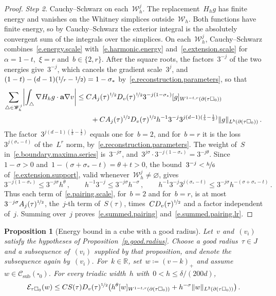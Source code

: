 \documentclass[11pt,letterpaper]{article}
\numberwithin{equation}{section}
\newtheorem{proposition}[theorem]{Proposition}
\theoremstyle{definition}
\newcommand{\R}{\mathbb{R}}
\renewcommand{\a}{\mathbf{a}}
\newcommand{\nf}{\nicefrac}
\newcommand{\cu}{\square}
\DeclarePairedDelimiter{\norm}{\lVert}{\rVert}
\newcommand{\Ener}{\mathcal E}
\newcommand{\Csub}{\mathcal C_{\mathrm{sub}}}
\begin{document}
\begin{proof}
\emph{Step 2.} Cauchy--Schwarz on each~$\mathscr W_h^j$. The replacement~$H_hg$ has finite energy and vanishes on the Whitney simplices outside~$\mathscr W_h$. Both functions have finite energy, so by Cauchy--Schwarz the exterior integral is the absolutely convergent sum of the integrals over the simplices. On each~$\mathscr W_h^j$, Cauchy--Schwarz combines~\eqref{e.energy.scale} with~\eqref{e.harmonic.energy} and~\eqref{e.extension.scale} for~$\alpha=1-t$,~$\xi=r$ and~$b\in\{2,r\}$. After the square roots, the factors~$3^{-j}$ of the two energies give~$3^{-j}$, which cancels the gradient scale~$3^j$, and~$(1-t)-(d-1)(\nf1r-\nf12)=1-\sigma_*$ by~\eqref{e.reconstruction.parameters}, so that
\begin{align}
	\sum_{\triangle\in\mathscr W_h^j}\biggl|\int_\triangle\nabla H_hg\cdot\a\nabla v\biggr|&\leq C A_j(\tau)^{\nf12}D_v(\tau)^{\nf12}3^{-j(1-\sigma_*)}[g]_{W^{1-t,r}(\partial(\tau\cu_0))}\notag \\
	& \qquad +C A_j(\tau)^{\nf12}D_v(\tau)^{\nf12}h^{-1}3^{-j}3^{j(d-1)(\frac1b-\frac12)}\norm{g}_{L^b(\partial(\tau\cu_0))}\,.
	\label{e.pairing.scale}
\end{align}
The factor~$3^{j(d-1)(\frac1b-\frac12)}$ equals one for~$b=2$, and for~$b=r$ it is the loss~$3^{j(\sigma_*-t)}$ of the~$L^r$ norm, by~\eqref{e.reconstruction.parameters}. The weight of~$S$ in~\eqref{e.boundary.maxima.series} is~$3^{-j\sigma}$, and~$3^{j\sigma}\cdot3^{-j(1-\sigma_*)}=3^{-j\theta}$. Since~$1-\sigma>0$ and~$1-(\sigma+\sigma_*-t)=\theta+t>0$, the bound~$3^{-j}<\nf h6$ of~\eqref{e.extension.support}, valid whenever~$\mathscr W_h^j\neq\varnothing$, gives
\begin{equation*}
	3^{-j(1-\sigma_*)}\leq 3^{-j\sigma}h^\theta\,,\qquad h^{-1}3^{-j}\leq 3^{-j\sigma}h^{-\sigma}\,,\qquad h^{-1}3^{-j}3^{j(\sigma_*-t)}\leq 3^{-j\sigma}h^{-(\sigma+\sigma_*-t)}\,.
\end{equation*}
Thus each term of~\eqref{e.pairing.scale}, for~$b=2$ and for~$b=r$, is at most~$3^{-j\sigma}A_j(\tau)^{\nf12}$, the~$j$-th term of~$S(\tau)$, times~$CD_v(\tau)^{\nf12}$ and a factor independent of~$j$. Summing over~$j$ proves~\eqref{e.summed.pairing} and~\eqref{e.summed.pairing.lr}.
\end{proof}

\begin{proposition}[Energy bound in a cube with a good radius]
\label{p.good.radius.energy}
Let~$v$ and~$(v_i)$ satisfy the hypotheses of Proposition~\ref{p.good.radius}. Choose a good radius~$\tau\in J$ and a subsequence of~$(v_i)$ supplied by that proposition, and denote the subsequence again by~$(v_i)$. For~$k\in\R$, set~$w\coloneqq(v-k)_+$ and assume~$w\in\Csub(\cu_0)$. For every triadic width~$h$ with~$0<h\leq\delta/(200d)$,
\begin{equation}
	\Ener_{\tau\cu_0}(w)\leq CS(\tau)D_v(\tau)^{\nf12}\bigl(h^\theta[w]_{W^{1-t,r}(\partial(\tau\cu_0))}+h^{-\sigma}\norm{w}_{L^2(\partial(\tau\cu_0))}\bigr)\,.
	\label{e.good.radius.energy.estimate}
\end{equation}
\end{proposition}
\end{document}
